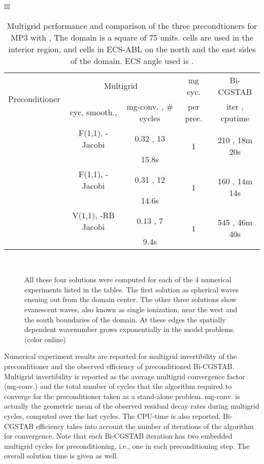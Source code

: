 \documentclass[mathpazo]{cicp}
\theoremstyle{definition}
\numberwithin{equation}{section}
\providecommand{\hbz}{}
\providecommand{\edt}{}
\begin{document}
\begin{algorithm}
\begin{enumerate}
\begin{tabular}{lll}
\begin{table}
 \begin{tabular}{|c|c|c|c|c|} \hline 
  \multirow{2}{*}{Preconditioner} & \multicolumn{2}{c|}{Multigrid} & mg cyc. & Bi-CGSTAB\\ \cline{2-3}
 & cyc, smooth.,  & mg-conv. , \# cycles & per prec. & iter , cputime \\ \hline
 & F(1,1), -Jacobi & 0.32 , 13 & \multirow{2}{*}{1} & \multirow{2}{*}{210 , 18m 20s}\\
 &  & 15.8s & & \\ \hline
 & F(1,1), -Jacobi & 0.31 , 12 & \multirow{2}{*}{1} & \multirow{2}{*}{160 , 14m 14s}\\
 &  & 14.6s & & \\ \hline
 & V(1,1), -RB Jacobi & 0.13 , 7 & \multirow{2}{*}{1} & \multirow{2}{*}{545 , 46m 40s}\\
 &  & 9.4s & & \\ \hline
 \end{tabular}
\caption{Multigrid performance and comparison of the three precondtioners for MP3 with , The domain is a square of 75 units.  cells are used in the interior region, and  cells in ECS-ABL on the north and the east sides of the domain. ECS angle used is .}
\label{tab:exp4}
\end{table}

\begin{figure}
\centering
{}
\\ 
\caption{All these four solutions were computed for each of the 4 numerical experiments listed in the tables. The first solution as spherical waves ensuing out from the domain center. The other three solutions show evanescent waves, also known as single ionization, near the west and the south boundaries of the domain. At these edges the spatially dependent wavenumber grows exponentially in the model problems. (color online)}
\label{fig:solplots}
\end{figure}

\hbz{Numerical experiment results are reported for multigrid invertibility of the preconditioner and the observed efficiency of preconditioned Bi-CGSTAB. Multigrid invertibility is reported as the average multigrid convergence factor (mg-conv.) and the total number of cycles that the algorithm required to converge for the preconditioner taken as a stand-alone problem. mg-conv. is actually the geometric mean of the observed residual decay \edt{rates during multigrid cycles}, computed over the last  cycles. The CPU-time is also reported. Bi-CGSTAB efficiency takes into account the number of iterations of the algorithm for convergence. Note that each Bi-CGSTAB iteration has two embedded multigrid cycles for preconditioning, i.e., one in each preconditioning step. The overall solution time is given as well.}


\end{tabular}
\end{enumerate}
\end{algorithm}
\end{document}
